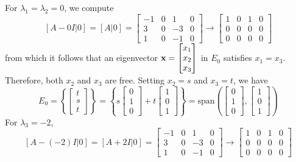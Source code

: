 For $\lambda_1=\lambda_2=0$, we compute
\[[A-0I|0]=[A|0]=\left[\begin{array}{ccc|c}
            -1 & 0 & 1  & 0 \\
            3  & 0 & -3 & 0 \\
            1  & 0 & -1 & 0
        \end{array}\right]\to\left[\begin{array}{ccc|c}
            1 & 0 & 1 & 0 \\
            0 & 0 & 0 & 0 \\
            0 & 0 & 0 & 0
        \end{array}\right]\]
from which it follows that an eigenvector $\mathbf{x}=\begin{bmatrix}
        x_1 \\x_2\\x_3
    \end{bmatrix}$ in $E_0$ satisfies $x_1=x_3$. Therefore, both $x_2$ and $x_3$ are free.
Setting $x_2=s$ and $x_3=t$, we have
\[
    E_0=\left\{\begin{bmatrix}
        t \\s\\t
    \end{bmatrix}\right\}=\left\{s\begin{bmatrix}
        0 \\1\\0
    \end{bmatrix}+t\begin{bmatrix}
        1 \\0\\1
    \end{bmatrix}\right\}=\text{span}\left(\begin{bmatrix}
            0 \\1\\0
        \end{bmatrix},\begin{bmatrix}
            1 \\0\\1
        \end{bmatrix}\right)
\]
For $\lambda_3=-2$,
\[[A-(-2)I|0]=[A+2I|0]=\left[\begin{array}{ccc|c}
            -1 & 0 & 1  & 0 \\
            3  & 0 & -3 & 0 \\
            1  & 0 & -1 & 0
        \end{array}\right]\to\left[\begin{array}{ccc|c}
            1 & 0 & 1 & 0 \\
            0 & 0 & 0 & 0 \\
            0 & 0 & 0 & 0
        \end{array}\right]\]
